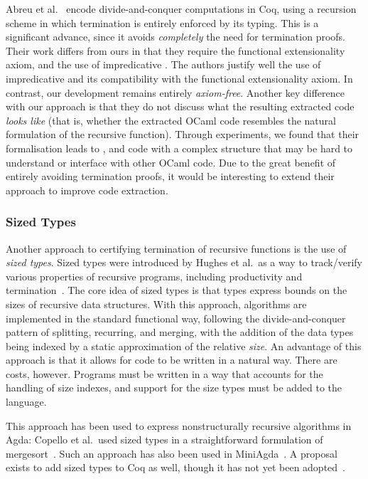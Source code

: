 \documentclass[ a4paper, UKenglish, cleveref, autoref, thm-restate]{lipics-v2021}
\begin{document}
Abreu et al.~\cite{AbreuDHJMS23} encode divide-and-conquer computations in Coq,
using a recursion scheme in which termination is entirely enforced by its
typing.  This is a significant advance, since it avoids \emph{completely} the
need for termination proofs. Their work differs from ours in that they require
the functional extensionality axiom, and the use of impredicative .
The authors justify well the use of impredicative  and its
compatibility with the functional extensionality axiom. In contrast, our
development remains entirely \emph{axiom-free}. Another key difference with our
approach is that they do not discuss what the resulting extracted code
\emph{looks like} (that is, whether the extracted OCaml code resembles the
natural formulation of the recursive function). Through experiments, we found
that their formalisation leads to , and code with a complex
structure that may be hard to understand or interface with other OCaml code.
Due to the great benefit of entirely avoiding termination proofs, it would be
interesting to extend their approach to improve code extraction.




\subsubsection{Sized Types}\label{sec:sizedT}

Another approach to certifying termination of recursive functions is the use of
\emph{sized types}. Sized types were introduced by Hughes et al.\ as a way to
track/verify various properties of recursive programs, including productivity
and termination~\cite{HughesPS96}. The core idea of sized types is that types
express bounds on the sizes of recursive data structures. With this approach,
algorithms are implemented in the standard functional way, following the
divide-and-conquer pattern of splitting, recurring, and merging, with the
addition of the data types being indexed by a static approximation of the
relative \emph{size}. An advantage of this approach is that it allows for code
to be written in a natural way. There are costs, however. Programs must be
written in a way that accounts for the handling of size indexes, and support for
the size types must be added to the language.

This approach has been used to express nonstructurally recursive
algorithms in Agda: Copello et al.\ used sized types in a straightforward
formulation of mergesort~\cite{CopelloTB14}. Such an approach has also been used
in MiniAgda~\cite{abs-1202-3496}. A proposal exists to add sized types to
Coq as well, though it has not yet been adopted~\cite{CHAN_2023}.
\end{document}
